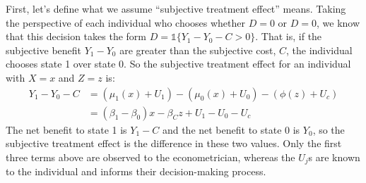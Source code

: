 \documentclass{article}
\begin{document}
\begin{solution}
\begin{figure}[H]
\begin{subfigure}[b]{0.43\textwidth}
    \end{subfigure}
\end{figure}
\end{solution}

First, let's define what we assume ``subjective treatment effect'' means. Taking the perspective of each individual who chooses whether $D=0$ or $D=0$, we know that this decision takes the form $D=\mathbb{1}\{Y_1-Y_0-C>0\}$. That is, if the subjective benefit $Y_1-Y_0$ are greater than the subjective cost, $C$, the individual chooses state 1 over state 0. So the subjective treatment effect for an individual with $X=x$ and $Z=z$ is:
\begin{align*}
    Y_1 - Y_0 - C &= (\mu_1(x) + U_1) - (\mu_0(x) + U_0) - (\phi(z) + U_c) \\
    &= (\beta_1- \beta_0)x - \beta_C z + U_1 - U_0 - U_c 
\end{align*}
The net benefit to state 1 is $Y_1 - C$ and the net benefit to state 0 is $Y_0$, so the subjective treatment effect is the difference in these two values. Only the first three terms above are observed to the econometrician, whereas the $U_j$s are known to the individual and informs their decision-making process.
\end{document}
